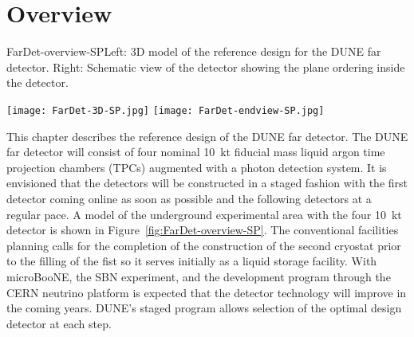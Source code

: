 \section{Overview}
\label{sec:detectors-fd-ref-ov}

\begin{cdrfigure}{FarDet-overview-SP}{Left: 3D model of the reference design for the DUNE far detector. Right: Schematic view of the detector showing the plane ordering inside the detector.}
\centering
\begin{minipage}[b]{1.0\textwidth}
\begin{center}
\texttt{[image: FarDet-3D-SP.jpg]}
\texttt{[image: FarDet-endview-SP.jpg]}
\end{center}
\end{minipage}
\end{cdrfigure}

This chapter describes the reference design of the DUNE far detector. The DUNE far detector will consist of four nominal 10~kt fiducial mass liquid argon time projection chambers (TPCs) augmented with a photon detection system. It is envisioned that the detectors will be constructed in a staged fashion with the first detector coming online as soon as possible and the following detectors at a regular pace. A model of the underground experimental area with the four 10~kt detector is shown in Figure~\ref{fig:FarDet-overview-SP}. The conventional facilities planning calls for the completion of the construction of the second cryostat prior to the filling of the fist so it serves initially as a liquid storage facility. With microBooNE, the SBN experiment, and the development program through the CERN neutrino platform is expected that the detector technology will improve in the coming years. DUNE's staged program allows selection of the optimal design detector at each step. 


